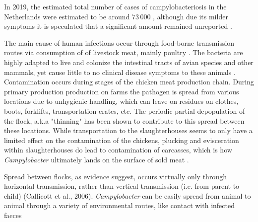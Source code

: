 In 2019, the estimated total number of cases of campylobacteriosis in the Netherlands were estimated to be around 73\,000 \parencite{lagerweij_disease_2020}, although due its milder symptoms it is speculated that a significant amount remained unreported \parencite{koutsoumanis_update_2020}.


The main cause of human infections occur through food-borne transmission routes via consumption of of livestock meat, mainly poultry \parencite{wilson_tracing_2008}. The bacteria are highly adapted to live and colonize the intestinal tracts of avian species and other mammals, yet cause little to no clinical disease symptoms to these animals \parencite{saif_diseases_2008}. Contamination occurs during stages of the chicken meat production chain. During primary production production on farms the pathogen is spread from various locations due to unhygienic handling, which can leave on residues on clothes, boots, forklifts, transportation crates, etc. The periodic partial depopulation of the flock, a.k.a "thinning" has been shown to contribute to this spread between these locations. While transportation to the slaughterhouses seems to only have a limited effect on the contamination of the chickens, plucking and  evisceration within slaughterhouses do lead to contamination of carcasses, which is how \textit{Campylobacter} ultimately lands on the surface of sold meat \parencite{skarp_campylobacteriosis_2015}.

Spread between flocks, as evidence suggest, occurs virtually only through horizontal transmission, rather than vertical transmission (i.e. from parent to child) (Callicott et al., 2006). \textit{Campylobacter} can be easily spread from animal to animal through a variety of environmental routes, like contact with infected faeces \parencite{}





